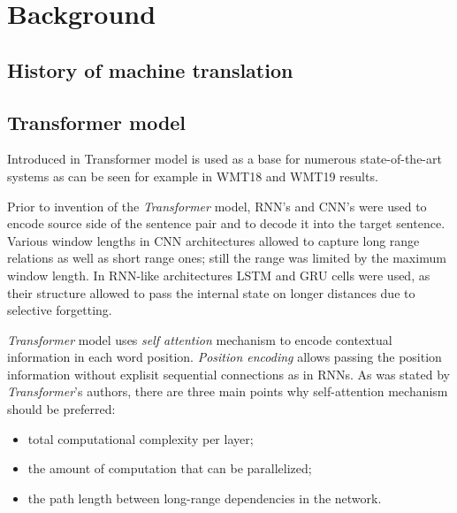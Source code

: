 \chapter{Background}

\section{History of machine translation}


\section{Transformer model}

Introduced in  Transformer model is used as a base
for numerous state-of-the-art systems as can be seen for example in 
WMT18  and
WMT19  results.

Prior to invention of the \textit{Transformer} model, RNN's and CNN's were used
to encode source side of the sentence pair and to decode it into the target sentence.
Various window lengths in CNN architectures allowed to capture long range relations
as well as short range ones; still the range was limited by the maximum window length.
In RNN-like architectures LSTM and GRU cells were used, as their structure allowed to
pass the internal state on longer distances due to selective forgetting.

\textit{Transformer} model uses \textit{self attention} mechanism to encode contextual
information in each word position. \textit{Position encoding} allows passing the position
information without explisit sequential connections as in RNNs.
As was stated by \textit{Transformer}'s authors, there are three main points why
self-attention mechanism should be preferred:
\begin{itemize}
  \item total computational complexity per layer;
  \item the amount of computation that can be parallelized;
  \item the path length between long-range dependencies in the network.
\end{itemize}

